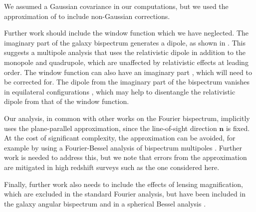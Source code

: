 We assumed a Gaussian covariance in our computations, but we used the approximation  of \cite{Chan:2016ehg} to include non-Gaussian corrections. 

Further work should include the window function which we have  neglected.
The imaginary part of the galaxy bispectrum generates a dipole, as shown in \cite{Clarkson:2018dwn}. This suggests a multipole analysis that uses the relativistic dipole in addition to the monopole and quadrupole, {which are unaffected by relativistic effects at leading order.} The
window function can also have an imaginary part \cite{Beutler:2018vpe}, which will need to be corrected for. The dipole from the imaginary part of the bispectrum vanishes in equilateral configurations \cite{Clarkson:2018dwn}, which may help to disentangle the relativistic dipole from that of the window function.

{Our analysis, in common with other works on the Fourier bispectrum, implicitly uses the plane-parallel approximation, since the line-of-sight direction ${\bm{n}}$ is fixed. At the cost of significant complexity, the approximation can be avoided, for example by using a Fourier-Bessel analysis of bispectrum multipoles \cite{Castorina:2017inr}. Further work is needed to address this, but we note that errors from the approximation are mitigated in high redshift surveys such as the one considered here.}

Finally, further work also needs to include the effects of lensing magnification, which are excluded in the standard Fourier analysis, but have been included in the galaxy angular bispectrum \cite{Kehagias:2015tda,DiDio:2015bua, DiDio:2016gpd, DiDio:2018unb} and in a spherical Bessel analysis \cite{Bertacca:2017dzm}. 